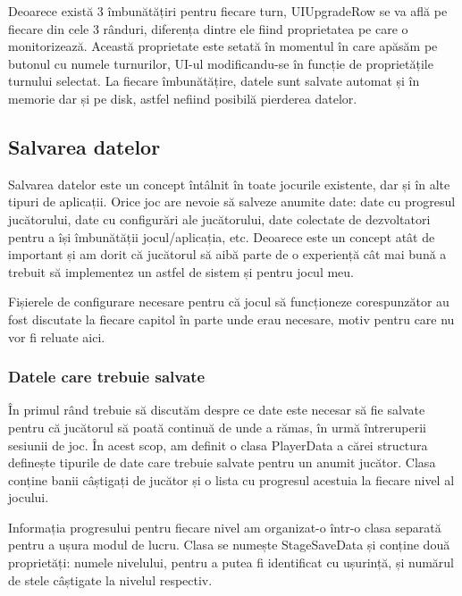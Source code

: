 \documentclass[12pt, a4paper]{article}
\begin{document}
	Deoarece există 3 îmbunătățiri pentru fiecare turn, UIUpgradeRow se va află pe fiecare din cele 3 rânduri, diferența dintre ele fiind proprietatea pe care o monitorizează. Această proprietate este setată în momentul în care apăsăm pe butonul cu numele turnurilor, UI-ul modificandu-se în funcție de proprietățile turnului selectat. La fiecare îmbunătățire, datele sunt salvate automat și în memorie dar și pe disk, astfel nefiind posibilă pierderea datelor.
	
	
	
	
	
	\subsection{Salvarea datelor}
	
	Salvarea datelor este un concept întâlnit în toate jocurile existente, dar și în alte tipuri de aplicații. Orice joc are nevoie să salveze anumite date: date cu progresul jucătorului, date cu configurări ale jucătorului, date colectate de dezvoltatori pentru a își îmbunătății jocul/aplicația, etc. Deoarece este un concept atât de important și am dorit că jucătorul să aibă parte de o experiență cât mai bună a trebuit să implementez un astfel de sistem și pentru jocul meu.
	\newline
	
	Fișierele de configurare necesare pentru că jocul să funcționeze corespunzător au fost discutate la fiecare capitol în parte unde erau necesare, motiv pentru care nu vor fi reluate aici.
	
	
	
	
	
	\subsubsection{Datele care trebuie salvate}
	
	În primul rând trebuie să discutăm despre ce date este necesar să fie salvate pentru că jucătorul să poată continuă de unde a rămas, în urmă întreruperii sesiunii de joc. În acest scop, am definit o clasa PlayerData a cărei structura definește tipurile de date care trebuie salvate pentru un anumit jucător. Clasa conține banii câștigați de jucător și o lista cu progresul acestuia la fiecare nivel al jocului. 
	\newline
	
	Informația progresului pentru fiecare nivel am organizat-o într-o clasa separată pentru a ușura modul de lucru. Clasa se numește StageSaveData și conține două proprietăți: numele nivelului, pentru a putea fi identificat cu ușurință, și numărul de stele câștigate la nivelul respectiv.
	\newline
	
\end{document}
